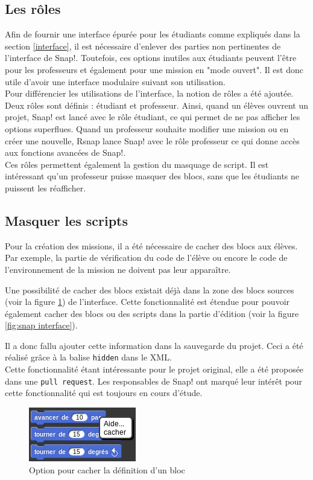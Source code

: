\subsection{Les rôles}
\label{role}
Afin de fournir une interface épurée pour les étudiants comme expliqués dans la section \ref{interface}, il est nécessaire d'enlever des parties non pertinentes de l'interface de Snap!. Toutefois, ces options inutiles aux étudiants peuvent l'être pour les professeurs et également pour une mission en "mode ouvert". Il est donc utile d'avoir une interface modulaire suivant son utilisation. \\

Pour différencier les utilisations de l'interface, la notion de rôles a été ajoutée. Deux rôles sont définis : étudiant et professeur. Ainsi, quand un élèves ouvrent un projet, Snap! est lancé avec le rôle étudiant, ce qui permet de ne pas afficher les options superflues. Quand un professeur souhaite modifier une mission ou en créer une nouvelle, Rsnap lance Snap! avec le rôle professeur ce qui donne accès aux fonctions avancées de Snap!.\\

Ces rôles permettent également la gestion du masquage de script. Il est intéressant qu'un professeur puisse masquer des blocs, sans que les étudiants ne puissent les réafficher.

\subsection{Masquer les scripts}
Pour la création des missions, il a été nécessaire de cacher des blocs aux élèves. Par exemple, la partie de vérification du code de l'élève ou encore le code de l'environnement de la mission ne doivent pas leur apparaître. 

Une possibilité de cacher des blocs existait déjà dans la zone des blocs sources (voir la figure \ref{fig:cacher}) de l'interface. Cette fonctionnalité est étendue pour pouvoir également cacher des blocs ou des scripts dans la partie d'édition (voir la figure \ref{fig:snap interface}).

Il a donc fallu ajouter cette information dans la sauvegarde du projet. Ceci a été réalisé grâce à la balise \texttt{hidden} dans le XML.\\


Cette fonctionnalité étant intéressante pour le projet original, elle a été proposée dans une \texttt{pull request}. Les responsables de Snap! ont marqué leur intérêt pour cette fonctionnalité qui est toujours en cours d'étude.
\begin{figure}
  \begin{center}
    \includegraphics[scale=0.5]{content/7-solution/2-snap/images/cacher}
    \caption{Option pour cacher la définition d'un bloc}
    \label{fig:cacher}
  \end{center}
\end{figure}

